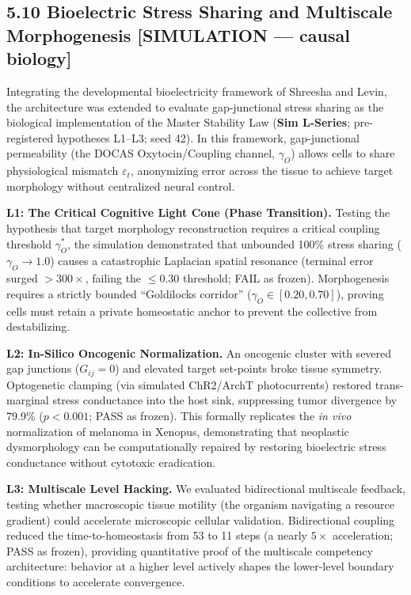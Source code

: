 \documentclass[
]{article}
\begin{document}
\subsection{5.10 Bioelectric Stress Sharing and Multiscale Morphogenesis
{[}SIMULATION --- causal
biology{]}}\label{bioelectric-stress-sharing-and-multiscale-morphogenesis-simulation-causal-biology}

Integrating the developmental bioelectricity framework of Shreesha and
Levin, the architecture was extended to evaluate gap-junctional stress
sharing as the biological implementation of the Master Stability Law
(\textbf{Sim L-Series}; pre-registered hypotheses L1--L3; seed 42). In
this framework, gap-junctional permeability (the DOCAS Oxytocin/Coupling
channel, \(\gamma_O\)) allows cells to share physiological mismatch
\(\varepsilon_t\), anonymizing error across the tissue to achieve target
morphology without centralized neural control.

\textbf{L1: The Critical Cognitive Light Cone (Phase Transition).}
Testing the hypothesis that target morphology reconstruction requires a
critical coupling threshold \(\gamma_O^*\), the simulation demonstrated
that unbounded 100\% stress sharing (\(\gamma_O \to 1.0\)) causes a
catastrophic Laplacian spatial resonance (terminal error surged
\(>300\times\), failing the \(\le 0.30\) threshold; FAIL as frozen).
Morphogenesis requires a strictly bounded ``Goldilocks corridor''
(\(\gamma_O \in [0.20, 0.70]\)), proving cells must retain a private
homeostatic anchor to prevent the collective from destabilizing.

\textbf{L2: In-Silico Oncogenic Normalization.} An oncogenic cluster
with severed gap junctions (\(G_{ij} = 0\)) and elevated target
set-points broke tissue symmetry. Optogenetic clamping (via simulated
ChR2/ArchT photocurrents) restored trans-marginal stress conductance
into the host sink, suppressing tumor divergence by 79.9\%
(\(p < 0.001\); PASS as frozen). This formally replicates the \emph{in
vivo} normalization of melanoma in Xenopus, demonstrating that
neoplastic dysmorphology can be computationally repaired by restoring
bioelectric stress conductance without cytotoxic eradication.

\textbf{L3: Multiscale Level Hacking.} We evaluated bidirectional
multiscale feedback, testing whether macroscopic tissue motility (the
organism navigating a resource gradient) could accelerate microscopic
cellular validation. Bidirectional coupling reduced the
time-to-homeostasis from 53 to 11 steps (a nearly \(5\times\)
acceleration; PASS as frozen), providing quantitative proof of the
multiscale competency architecture: behavior at a higher level actively
shapes the lower-level boundary conditions to accelerate convergence.
\end{document}
